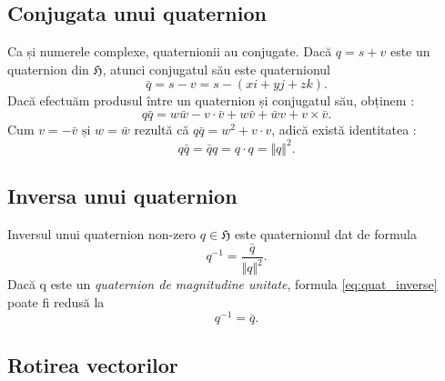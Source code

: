 \subsection{Conjugata unui quaternion}
Ca și numerele complexe, quaternionii au conjugate.
Dacă $q = s + v$ este un quaternion din $\mathfrak{H}$, atunci conjugatul său este
quaternionul
\begin{equation}
\bar{q} = s - v = s - (x\mathit{i} + y\mathit{j} + z\mathit{k}).
\end{equation}
Dacă efectuăm produsul între un quaternion și conjugatul său, obținem :
\[
q\bar{q} = w\bar{w} - v \cdot \bar{v} + w\bar{v} + \bar{w}v + v \times \bar{v}.
\]
Cum $v = -\bar{v} \text{ și } w = \bar{w}$ rezultă că $q\bar{q} = w^2 +
v\cdot v$, adică există identitatea : 
\begin{equation}
q\bar{q} = \bar{q}q = q \cdot q = \Vert q \Vert ^ 2.
\end{equation}

\subsection{Inversa unui quaternion}
Inversul unui quaternion non-zero $q \in \mathfrak{H}$ este quaternionul dat de 
formula
\begin{equation}
\label{eq:quat_inverse}
q^{-1} = \frac{\bar{q}}{\Vert q \Vert ^ 2}.
\end{equation}
Dacă q este un \textit{quaternion de magnitudine unitate}, formula
\eqref{eq:quat_inverse} poate fi redusă la
\begin{equation}
q^{-1} = \bar{q}.
\end{equation}

\subsection{Rotirea vectorilor}

